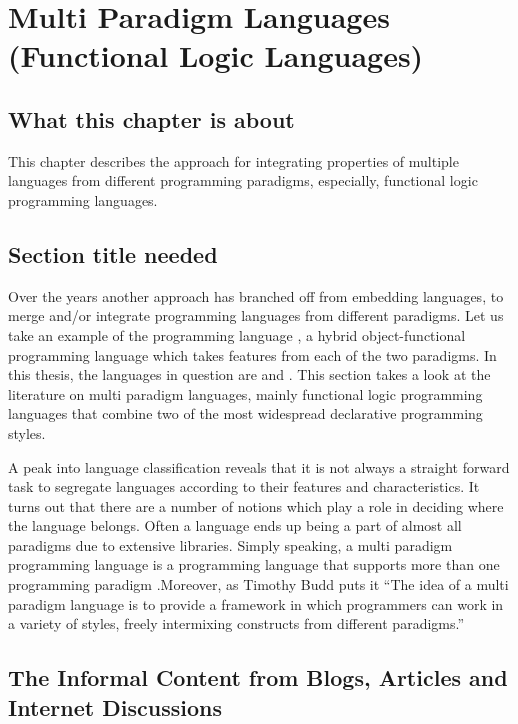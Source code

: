 \documentclass[thesis-solanki.tex]{subfiles}
\begin{document}
\chapter{Multi Paradigm Languages (Functional Logic Languages)}\label{chap:multiparadigm}


\section{What this chapter is about}

This chapter describes the approach for integrating properties of multiple languages from different programming paradigms, especially, 
functional logic programming languages.  

\section{Section title needed}
Over the years another approach has branched off from embedding languages, to merge and/or integrate programming
languages from different paradigms.
Let us take an example of the  programming language \cite{website:scala}, a hybrid
object-functional programming language which takes features from each of the two paradigms.
In this thesis, the languages in question are  and .
This section takes a look at the literature on multi paradigm languages, mainly functional logic programming
languages that combine two of the most widespread declarative programming styles.

A peak into language classification reveals that it is not always a straight forward task to segregate languages
according to their features and characteristics.
It turns out that there are a number of notions which play a role in deciding where the language belongs.
Often a language ends up being a part of almost all paradigms due to extensive libraries.
Simply speaking, a multi paradigm programming language is a programming language that supports more than one
programming paradigm \cite{Krishnamurthi:2008:TPL:1480828.1480846}.Moreover, as Timothy Budd puts it
\cite{website:wikimultiparadigm} ``The idea of a multi paradigm language is to provide a framework in which
programmers can work in a variety of styles, freely intermixing constructs from different paradigms.''


\section{The Informal Content from Blogs, Articles and Internet Discussions}
  
\end{document}
